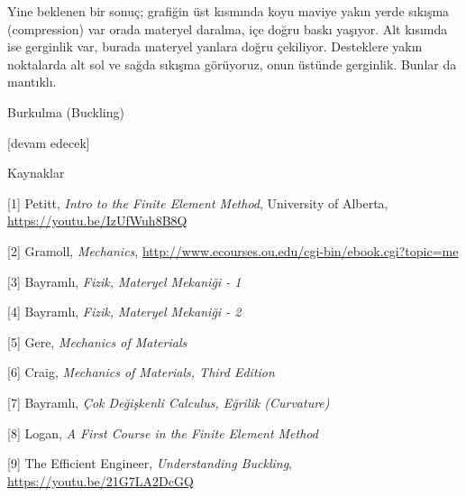 \documentclass[12pt,fleqn]{article}\usepackage{../../common}
\begin{document}
Yine beklenen bir sonuç; grafiğin üst kısmında koyu maviye yakın yerde sıkışma
(compression) var orada materyel daralma, içe doğru baskı yaşıyor. Alt kısımda
ise gerginlik var, burada materyel yanlara doğru çekiliyor. Desteklere yakın
noktalarda alt sol ve sağda sıkışma görüyoruz, onun üstünde gerginlik.  Bunlar
da mantıklı.

Burkulma (Buckling)



[devam edecek]

Kaynaklar

[1] Petitt, {\em Intro to the Finite Element Method}, University of Alberta,
    \url{https://youtu.be/IzUfWuh8B8Q}

[2] Gramoll, {\em Mechanics},
    \url{http://www.ecourses.ou.edu/cgi-bin/ebook.cgi?topic=me}

[3] Bayramlı, {\em Fizik, Materyel Mekaniği - 1}
    
[4] Bayramlı, {\em Fizik, Materyel Mekaniği - 2}

[5] Gere, {\em Mechanics of Materials}

[6] Craig, {\em Mechanics of Materials, Third Edition}

[7] Bayramlı, {\em Çok Değişkenli Calculus, Eğrilik (Curvature)}

[8] Logan, {\em A First Course in the Finite Element Method}

[9] The Efficient Engineer, {\em Understanding Buckling},
    \url{https://youtu.be/21G7LA2DcGQ}
  
\end{document}
